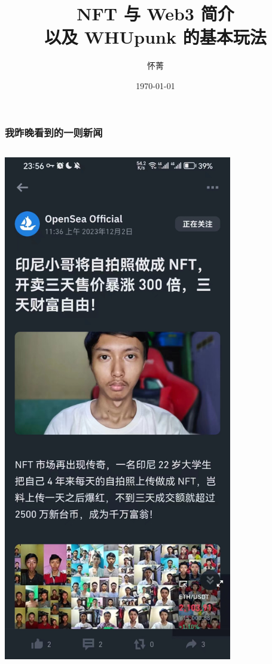 \documentclass{beamer}
\title{NFT 与 Web3 简介 \\ 以及 WHUpunk 的基本玩法}
\author{怀菁}
\institute{武汉大学}
\date{\today}
\begin{document}
\frame{\titlepage}

\begin{frame}
    \frametitle{我昨晚看到的一则新闻}

    \begin{columns}
        \begin{column}{0.5\textwidth}
            \centering
            \includegraphics[width=0.8\textwidth]{p1.jpg}
        \end{column}
        \begin{column}{0.5\textwidth}

\end{column}
\end{columns}
\end{frame}
\end{document}
